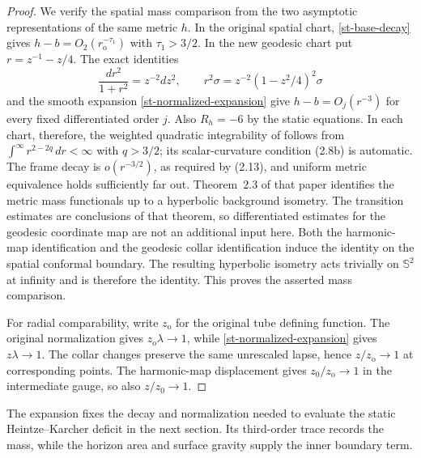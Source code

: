 \begin{proof}
We verify the spatial mass comparison from the two asymptotic
representations of the same metric $h$. In the original spatial chart,
\eqref{st-base-decay} gives $h-b=O_2(r_{\mathrm o}^{-\tau_1})$
with $\tau_1>3/2$. In the new geodesic chart put $r=z^{-1}-z/4$.
The exact identities
\[
 \frac{dr^2}{1+r^2}=z^{-2}dz^2,\qquad
 r^2\sigma=z^{-2}(1-z^2/4)^2\sigma
\]
and the smooth expansion \eqref{st-normalized-expansion} give
$h-b=O_j(r^{-3})$ for every fixed differentiated order $j$.
Also $R_h=-6$ by the static equations. In each chart, therefore,
the weighted quadratic integrability of
\cite[Equation~(2.8a)]{chruscielherzlich2003} follows from
$\int^\infty r^{2-2q}\,dr<\infty$ with $q>3/2$;
its scalar-curvature condition (2.8b) is automatic.
The frame decay is $o(r^{-3/2})$, as required by (2.13), and
uniform metric equivalence holds sufficiently far out.
Theorem~2.3 of that paper identifies the metric mass functionals
up to a hyperbolic background isometry. The transition estimates
are conclusions of that theorem, so differentiated estimates for
the geodesic coordinate map are not an additional input here.
Both the harmonic-map identification and the geodesic collar
identification induce the identity on the spatial conformal boundary.
The resulting hyperbolic isometry acts trivially on $\mathbb S^2$
at infinity and is therefore the identity. This proves the asserted
mass comparison.

For radial comparability, write $z_{\mathrm o}$ for the original
tube defining function. The original normalization gives
$z_{\mathrm o}\lambda\to1$, while
\eqref{st-normalized-expansion} gives $z\lambda\to1$.
The collar changes preserve the same unrescaled lapse, hence
$z/z_{\mathrm o}\to1$ at corresponding points. The harmonic-map
displacement gives $z_0/z_{\mathrm o}\to1$ in the intermediate
gauge, so also $z/z_0\to1$.
\end{proof}

The expansion fixes the decay and normalization needed to evaluate
the static Heintze--Karcher deficit in the next section. Its third-order
trace records the mass, while the horizon area and surface gravity
supply the inner boundary term.

